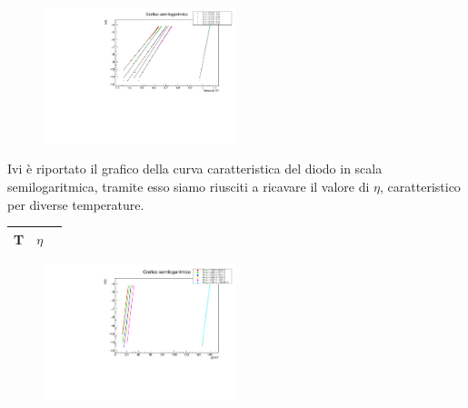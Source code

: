 \documentclass[10pt,twocolumn]{article}
\begin{document}
\begin{figure}[H] %
  \centering
  \includegraphics[width=0.5\textwidth]{scala_semilogaritmica.pdf} %
  \label{fig:I_V_}
\end{figure}
Ivi è riportato il grafico della curva caratteristica del diodo in scala semilogaritmica, tramite esso siamo riusciti a ricavare il valore di $\eta$, 
caratteristico per diverse temperature.
\begin{table}
	\centering
	\begin{tabular}{|c|c|c|}
		\hline
		\textbf{T} & \textbf{$\eta$} \\ \hline
	\end{tabular}
\end{table}




\begin{figure}[H] %
  \centering
  \includegraphics[width=0.5\textwidth]{coefficente_etatot.pdf} %
  \label{fig:I}
\end{figure}
\end{document}
